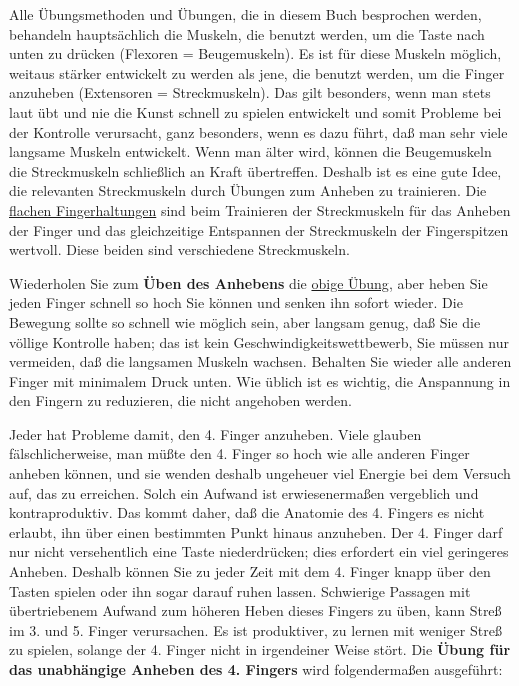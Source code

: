 Alle Übungsmethoden und Übungen, die in diesem Buch besprochen werden, behandeln hauptsächlich die Muskeln, die benutzt werden, um die Taste nach unten zu drücken (Flexoren = Beugemuskeln).
Es ist für diese Muskeln möglich, weitaus stärker entwickelt zu werden als jene, die benutzt werden, um die Finger anzuheben (Extensoren = Streckmuskeln).
Das gilt besonders, wenn man stets laut übt und nie die Kunst schnell zu spielen entwickelt und somit Probleme bei der Kontrolle verursacht, ganz besonders, wenn es dazu führt, daß man sehr viele langsame Muskeln entwickelt.
Wenn man älter wird, können die Beugemuskeln die Streckmuskeln schließlich an Kraft übertreffen.
Deshalb ist es eine gute Idee, die relevanten Streckmuskeln durch Übungen zum Anheben zu trainieren.
Die \hyperref[c1iii4b]{flachen Fingerhaltungen} sind beim Trainieren der Streckmuskeln für das Anheben der Finger und das gleichzeitige Entspannen der Streckmuskeln der Fingerspitzen wertvoll.
Diese beiden sind verschiedene Streckmuskeln.


\label{c1iii7anheben}

Wiederholen Sie zum \textbf{Üben des Anhebens} die \hyperref[c1iii7finger]{obige Übung}, aber heben Sie jeden Finger schnell so hoch Sie können und senken ihn sofort wieder.
Die Bewegung sollte so schnell wie möglich sein, aber langsam genug, daß Sie die völlige Kontrolle haben; das ist kein Geschwindigkeitswettbewerb, Sie müssen nur vermeiden, daß die langsamen Muskeln wachsen.
Behalten Sie wieder alle anderen Finger mit minimalem Druck unten.
Wie üblich ist es wichtig, die Anspannung in den Fingern zu reduzieren, die nicht angehoben werden.

Jeder hat Probleme damit, den 4. Finger anzuheben.
Viele glauben fälschlicherweise, man müßte den 4. Finger so hoch wie alle anderen Finger anheben können, und sie wenden deshalb ungeheuer viel Energie bei dem Versuch auf, das zu erreichen.
Solch ein Aufwand ist erwiesenermaßen vergeblich und kontraproduktiv.
Das kommt daher, daß die Anatomie des 4. Fingers es nicht erlaubt, ihn über einen bestimmten Punkt hinaus anzuheben.
Der 4. Finger darf nur nicht versehentlich eine Taste niederdrücken; dies erfordert ein viel geringeres Anheben.
Deshalb können Sie zu jeder Zeit mit dem 4. Finger knapp über den Tasten spielen oder ihn sogar darauf ruhen lassen.
Schwierige Passagen mit übertriebenem Aufwand zum höheren Heben dieses Fingers zu üben, kann Streß im 3. und 5. Finger verursachen.
Es ist produktiver, zu lernen mit weniger Streß zu spielen, solange der 4. Finger nicht in irgendeiner Weise stört.
\label{c1iii7finger4}
Die \textbf{Übung für das unabhängige Anheben des 4. Fingers} wird folgendermaßen ausgeführt:

